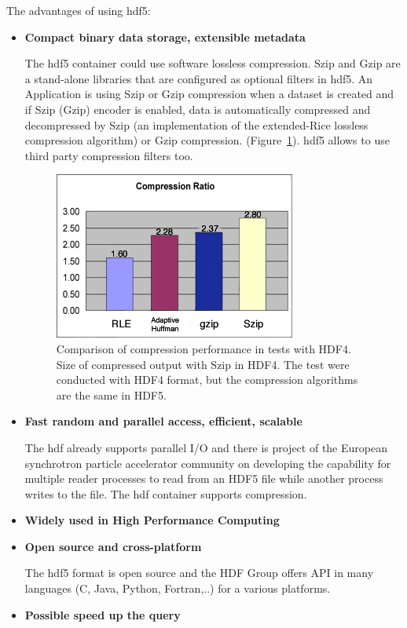 The advantages of using \gls{hdf5}: \cite{neurohdf}
\begin{itemize}
	\item \textbf{Compact binary data storage, extensible metadata}
	
	The \gls{hdf5} container could use software lossless compression. Szip and Gzip are a stand-alone libraries that are configured as optional filters in \gls{hdf5}. An Application is using Szip or Gzip compression when a dataset is created and if Szip (Gzip) encoder is enabled, data is automatically compressed and decompressed by Szip (an implementation of the extended-Rice lossless compression algorithm) or Gzip compression. (Figure~\ref{hdf_compression}). \gls{hdf5} allows to use third party compression filters too.
	
	
	\begin{figure}
		\centering
			\includegraphics[scale=0.89]{obrazky/H4_szip_size.png}
			\caption{Comparison of compression performance in tests with HDF4. Size of compressed output with Szip in HDF4. The test were conducted with HDF4 format, but the compression algorithms are the same in HDF5.}
			\label{hdf_compression}
	\end{figure}
	
	\item \textbf{Fast random and parallel access, efficient, scalable}
	
	The \gls{hdf} already supports parallel I/O and there is project of the European synchrotron particle accelerator community on developing the capability for multiple reader processes to read from an HDF5 file while another process writes to the file. The \gls{hdf} container supports compression.
	\item \textbf{Widely used in High Performance Computing}
		
	\item \textbf{Open source and cross-platform}
	
	The \gls{hdf5} format is open source and the HDF Group offers API in many languages (C, Java, Python, Fortran,..) for a various platforms.
	\item \textbf{Possible speed up the query} \cite{hdffast}
\end{itemize}
